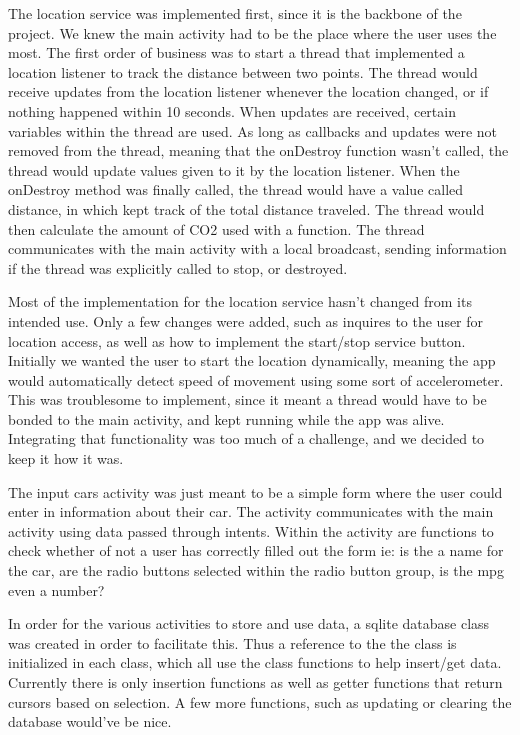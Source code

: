 \documentclass[twoside,twocolumn]{article}
\begin{document}
The location service was implemented first, since it is the backbone of the project. We knew the main activity had to be the place where the user uses the most. The first order of business was to start a thread that implemented a location listener to track the distance between two points. The thread would receive updates from the location listener whenever the location changed, or if nothing happened within 10 seconds. When updates are received, certain variables within the thread are used. As long as callbacks and updates were not removed from the thread, meaning that the onDestroy function wasn't called, the thread would update values given to it by the location listener. When the onDestroy method was finally called, the thread would have a value called distance, in which kept track of the total distance traveled. The thread would then calculate the amount of CO2 used with a function. The thread communicates with the main activity with a local broadcast, sending information if the thread was explicitly called to stop, or destroyed.

Most of the implementation for the location service hasn't changed from its intended use. Only a few changes were added, such as inquires to the user for location access, as well as how to implement the start/stop service button. Initially we wanted the user to start the location dynamically, meaning the app would automatically detect speed of movement using some sort of accelerometer. This was troublesome to implement, since it meant a thread would have to be bonded to the main activity, and kept running while the app was alive. Integrating that functionality was too much of a challenge, and we decided to keep it how it was.

The input cars activity was just meant to be a simple form where the user could enter in information about their car. The activity communicates with the main activity using data passed through intents. Within the activity are functions to check whether of not a user has correctly filled out the form ie: is the a name for the car, are the radio buttons selected within the radio button group, is the mpg even a number?

In order for the various activities to store and use data, a sqlite database class was created in order to facilitate this. Thus a reference to  the the class is initialized in each class, which all use the class functions to help insert/get data. Currently there is only insertion functions as well as getter functions that return cursors based on selection. A few more functions, such as updating or clearing the database would've be nice. 
\end{document}
